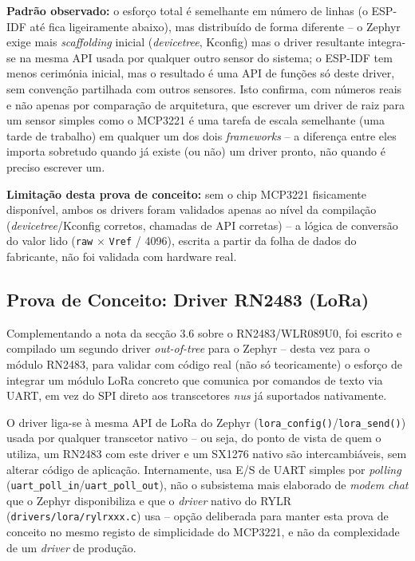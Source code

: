 \documentclass[a4paper,12pt]{article}
\begin{document}
\textbf{Padrão observado:} o esforço total é semelhante em número de linhas (o ESP-IDF até fica ligeiramente abaixo), mas distribuído de forma diferente -- o Zephyr exige mais \textit{scaffolding} inicial (\textit{devicetree}, Kconfig) mas o driver resultante integra-se na mesma API usada por qualquer outro sensor do sistema; o ESP-IDF tem menos cerimónia inicial, mas o resultado é uma API de funções só deste driver, sem convenção partilhada com outros sensores. Isto confirma, com números reais e não apenas por comparação de arquitetura, que escrever um driver de raiz para um sensor simples como o MCP3221 é uma tarefa de escala semelhante (uma tarde de trabalho) em qualquer um dos dois \textit{frameworks} -- a diferença entre eles importa sobretudo quando já existe (ou não) um driver pronto, não quando é preciso escrever um.

\textbf{Limitação desta prova de conceito:} sem o chip MCP3221 fisicamente disponível, ambos os drivers foram validados apenas ao nível da compilação (\textit{devicetree}/Kconfig corretos, chamadas de API corretas) -- a lógica de conversão do valor lido (\texttt{raw} $\times$ \texttt{Vref} / 4096), escrita a partir da folha de dados do fabricante, não foi validada com hardware real.

\subsection{Prova de Conceito: Driver RN2483 (LoRa)}
Complementando a nota da secção 3.6 sobre o RN2483/WLR089U0, foi escrito e compilado um segundo driver \textit{out-of-tree} para o Zephyr -- desta vez para o módulo RN2483, para validar com código real (não só teoricamente) o esforço de integrar um módulo LoRa concreto que comunica por comandos de texto via UART, em vez do SPI direto aos transcetores \textit{nus} já suportados nativamente.

O driver liga-se à mesma API de LoRa do Zephyr (\texttt{lora\_config()}/\texttt{lora\_send()}) usada por qualquer transcetor nativo -- ou seja, do ponto de vista de quem o utiliza, um RN2483 com este driver e um SX1276 nativo são intercambiáveis, sem alterar código de aplicação. Internamente, usa E/S de UART simples por \textit{polling} (\texttt{uart\_poll\_in}/\texttt{uart\_poll\_out}), não o subsistema mais elaborado de \textit{modem chat} que o Zephyr disponibiliza e que o \textit{driver} nativo do RYLR (\texttt{drivers/lora/rylrxxx.c}) usa -- opção deliberada para manter esta prova de conceito no mesmo registo de simplicidade do MCP3221, e não da complexidade de um \textit{driver} de produção.
\end{document}
